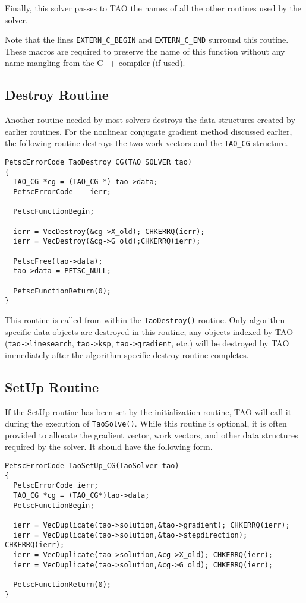 Finally, this solver passes to TAO the names of all the other routines
used by the solver.  

Note that the lines {\tt EXTERN\_C\_BEGIN} and {\tt EXTERN\_C\_END} surround
this routine.  These macros are required to preserve the name of this
function without any name-mangling from the C++ compiler (if used).

\subsection{Destroy Routine}
Another routine needed by most solvers destroys the data structures
created by earlier routines.  For the nonlinear conjugate gradient
method discussed earlier, the following routine destroys the two
work vectors and the {\tt TAO\_CG} structure.
\begin{verbatim}
PetscErrorCode TaoDestroy_CG(TAO_SOLVER tao)
{
  TAO_CG *cg = (TAO_CG *) tao->data;
  PetscErrorCode    ierr;

  PetscFunctionBegin;

  ierr = VecDestroy(&cg->X_old); CHKERRQ(ierr);
  ierr = VecDestroy(&cg->G_old);CHKERRQ(ierr);

  PetscFree(tao->data);
  tao->data = PETSC_NULL;

  PetscFunctionReturn(0);
}
\end{verbatim}
This routine is called from within the {\tt TaoDestroy()} routine.
Only algorithm-specific data objects are destroyed in this
routine; any objects indexed by TAO ({\tt tao->linesearch}, {\tt tao->ksp}, {\tt tao->gradient}, etc.)
will be destroyed by TAO immediately after the algorithm-specific destroy 
routine completes.


\subsection{SetUp Routine}
If the SetUp routine has been set by the initialization routine, TAO
will call it during the execution of \texttt{TaoSolve()}.
While this routine is optional, it is often provided to allocate
the gradient vector, work vectors, and other data structures 
required by the solver.
It should have the following form.
\begin{verbatim}
PetscErrorCode TaoSetUp_CG(TaoSolver tao)
{
  PetscErrorCode ierr;
  TAO_CG *cg = (TAO_CG*)tao->data;
  PetscFunctionBegin;

  ierr = VecDuplicate(tao->solution,&tao->gradient); CHKERRQ(ierr);
  ierr = VecDuplicate(tao->solution,&tao->stepdirection); CHKERRQ(ierr);
  ierr = VecDuplicate(tao->solution,&cg->X_old); CHKERRQ(ierr);
  ierr = VecDuplicate(tao->solution,&cg->G_old); CHKERRQ(ierr);

  PetscFunctionReturn(0);
}
\end{verbatim}

